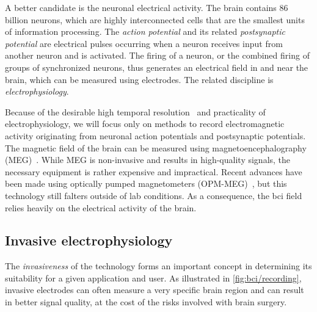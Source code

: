 A better candidate is the neuronal electrical activity.
The brain contains 86 billion neurons, which are highly interconnected cells that are
the smallest units of information processing.
The \emph{action potential} and its related \emph{postsynaptic potential} are electrical
pulses occurring when a neuron receives input from another neuron and is activated.
The firing of a neuron, or the combined firing of groups of synchronized neurons, thus
generates an electrical field in and near the brain, which can be measured using
electrodes.
The related discipline is \emph{electrophysiology}.

Because of the desirable high temporal resolution~\cite{Easttom2021} and practicality of
electrophysiology, we will focus only on methods to record electromagnetic activity
originating from neuronal action potentials and postsynaptic potentials.
The magnetic field of the brain can be measured using magnetoencephalography
(MEG)~\cite{Mellinger2007}.
While MEG is non-invasive and results in high-quality signals, the necessary equipment
is rather expensive and impractical.
Recent advances have been made using optically pumped magnetometers
(OPM-MEG)~\cite{Wittevrongel2021}, but this technology still falters outside of lab
conditions.
As a consequence, the \ac{bci} field relies heavily on the electrical activity of the
brain.

\subsection{Invasive electrophysiology}

The \emph{invasiveness} of the technology forms an important concept in determining its
suitability for a given application and user.
As illustrated in \cref{fig:bci/recording}, invasive electrodes can often measure a
very specific brain region and can result in better signal quality, at the cost of the
risks involved with brain surgery.

